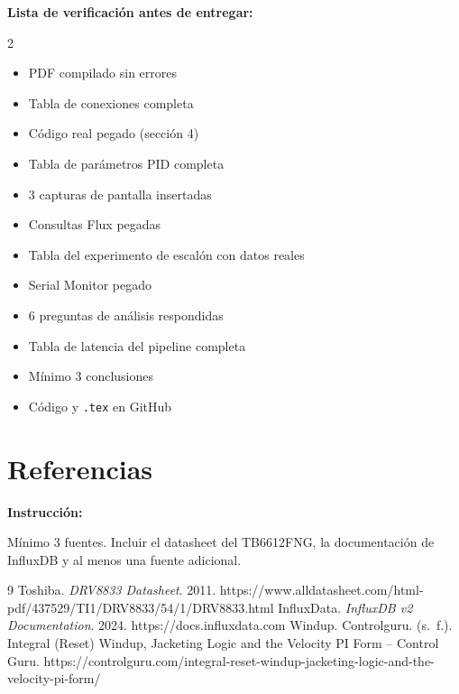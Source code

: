 \documentclass[11pt, letterpaper]{article}
\newenvironment{instruccion}{%
  \begin{mdframed}[backgroundcolor=tealLight,linecolor=tealMain,linewidth=1pt,
    innerleftmargin=10pt,innerrightmargin=10pt,
    innertopmargin=6pt,innerbottommargin=6pt]
  \small\textbf{\color{tealMain}Instrucci\'on:}\hspace{4pt}
}{\end{mdframed}}
\begin{document}
\begin{mdframed}[backgroundcolor=amberLight,linecolor=amberMain,linewidth=1pt,
  innerleftmargin=12pt,innerrightmargin=12pt,
  innertopmargin=8pt,innerbottommargin=8pt]
  \textbf{\color{amberMain}Lista de verificaci\'on antes de entregar:}
  \begin{multicols}{2}
  \begin{itemize}[leftmargin=1.5cm, label=$\square$, itemsep=2pt]
    \item PDF compilado sin errores
    \item Tabla de conexiones completa
    \item C\'odigo real pegado (secci\'on 4)
    \item Tabla de par\'ametros PID completa
    \item 3 capturas de pantalla insertadas
    \item Consultas Flux pegadas
    \item Tabla del experimento de escal\'on con datos reales
    \item Serial Monitor pegado
    \item 6 preguntas de an\'alisis respondidas
    \item Tabla de latencia del pipeline completa
    \item M\'inimo 3 conclusiones
    \item C\'odigo y \texttt{.tex} en GitHub
  \end{itemize}
  \end{multicols}
\end{mdframed}

\vspace{0.4cm}

\section*{Referencias}

\begin{instruccion}
  M\'inimo 3 fuentes. Incluir el datasheet del TB6612FNG,
  la documentaci\'on de InfluxDB y al menos una fuente adicional.
\end{instruccion}

\begin{thebibliography}{9}
    Toshiba. \textit{DRV8833 Datasheet}. 2011. https://www.alldatasheet.com/html-pdf/437529/TI1/DRV8833/54/1/DRV8833.html
    InfluxData. \textit{InfluxDB v2 Documentation}. 2024.
                   https://docs.influxdata.com
   Windup. Controlguru. (s. f.). Integral (Reset) Windup, Jacketing Logic and the Velocity PI Form – Control Guru. https://controlguru.com/integral-reset-windup-jacketing-logic-and-the-velocity-pi-form/
\end{thebibliography}
\end{document}
